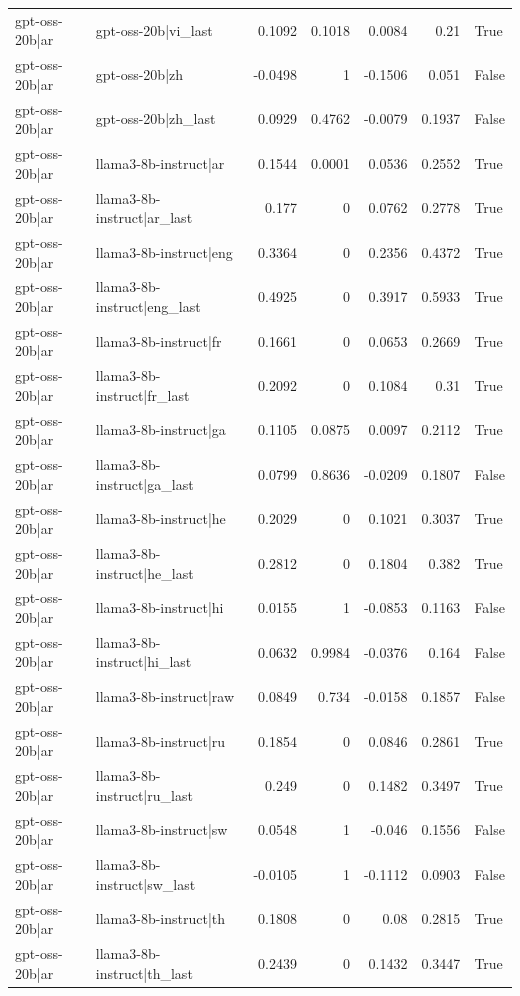 \begin{table}
\begin{tabular}{l l r r r r l}
gpt-oss-20b|ar & gpt-oss-20b|vi_last & 0.1092 & 0.1018 & 0.0084 & 0.21 & True \\
gpt-oss-20b|ar & gpt-oss-20b|zh & -0.0498 & 1 & -0.1506 & 0.051 & False \\
gpt-oss-20b|ar & gpt-oss-20b|zh_last & 0.0929 & 0.4762 & -0.0079 & 0.1937 & False \\
gpt-oss-20b|ar & llama3-8b-instruct|ar & 0.1544 & 0.0001 & 0.0536 & 0.2552 & True \\
gpt-oss-20b|ar & llama3-8b-instruct|ar_last & 0.177 & 0 & 0.0762 & 0.2778 & True \\
gpt-oss-20b|ar & llama3-8b-instruct|eng & 0.3364 & 0 & 0.2356 & 0.4372 & True \\
gpt-oss-20b|ar & llama3-8b-instruct|eng_last & 0.4925 & 0 & 0.3917 & 0.5933 & True \\
gpt-oss-20b|ar & llama3-8b-instruct|fr & 0.1661 & 0 & 0.0653 & 0.2669 & True \\
gpt-oss-20b|ar & llama3-8b-instruct|fr_last & 0.2092 & 0 & 0.1084 & 0.31 & True \\
gpt-oss-20b|ar & llama3-8b-instruct|ga & 0.1105 & 0.0875 & 0.0097 & 0.2112 & True \\
gpt-oss-20b|ar & llama3-8b-instruct|ga_last & 0.0799 & 0.8636 & -0.0209 & 0.1807 & False \\
gpt-oss-20b|ar & llama3-8b-instruct|he & 0.2029 & 0 & 0.1021 & 0.3037 & True \\
gpt-oss-20b|ar & llama3-8b-instruct|he_last & 0.2812 & 0 & 0.1804 & 0.382 & True \\
gpt-oss-20b|ar & llama3-8b-instruct|hi & 0.0155 & 1 & -0.0853 & 0.1163 & False \\
gpt-oss-20b|ar & llama3-8b-instruct|hi_last & 0.0632 & 0.9984 & -0.0376 & 0.164 & False \\
gpt-oss-20b|ar & llama3-8b-instruct|raw & 0.0849 & 0.734 & -0.0158 & 0.1857 & False \\
gpt-oss-20b|ar & llama3-8b-instruct|ru & 0.1854 & 0 & 0.0846 & 0.2861 & True \\
gpt-oss-20b|ar & llama3-8b-instruct|ru_last & 0.249 & 0 & 0.1482 & 0.3497 & True \\
gpt-oss-20b|ar & llama3-8b-instruct|sw & 0.0548 & 1 & -0.046 & 0.1556 & False \\
gpt-oss-20b|ar & llama3-8b-instruct|sw_last & -0.0105 & 1 & -0.1112 & 0.0903 & False \\
gpt-oss-20b|ar & llama3-8b-instruct|th & 0.1808 & 0 & 0.08 & 0.2815 & True \\
gpt-oss-20b|ar & llama3-8b-instruct|th_last & 0.2439 & 0 & 0.1432 & 0.3447 & True \\

\end{tabular}
\end{table}
